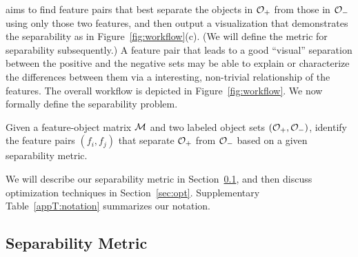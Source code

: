 \genviz aims to find feature pairs that
best separate the objects
in ${\mathcal{O}}_+$ from those in ${\mathcal{O}}_-$ using only those two features,
and then output a visualization that demonstrates the separability
as in Figure~\ref{fig:workflow}(c).
(We will define the metric for separability subsequently.)
A feature pair that leads to a good ``visual'' separation
between the positive and the negative sets may be able
to explain or characterize the differences between them
via a interesting,
non-trivial relationship of the features.
The overall workflow is depicted in Figure~\ref{fig:workflow}.
We now formally define the separability problem.
\begin{formulation}[Separability]\label{prob:separability}
Given a feature-object matrix ${\mathcal{M}}$ and two labeled object sets $({\mathcal{O}}_+,{\mathcal{O}}_-)$, identify the \topk feature pairs $(f_i,f_j)$ that separate ${\mathcal{O}}_+$ from ${\mathcal{O}}_-$ based on a given separability metric.
\end{formulation}
\noindent %
We will describe our separability metric in Section~\ref{sec:metric}, and then discuss optimization techniques in Section~\ref{sec:opt}. Supplementary Table~\ref{appT:notation} summarizes our notation.



\subsection{Separability Metric}\label{sec:metric}

